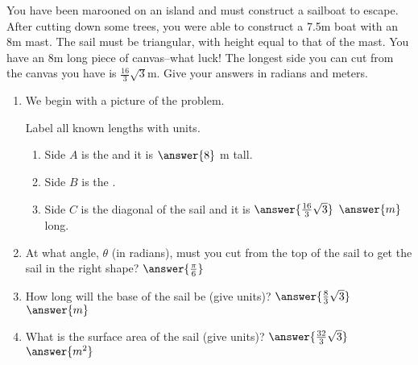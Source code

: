 \documentclass{ximera}
\author{Elizabeth Campolongo}
\begin{document}
\begin{exercise}

You have been marooned on an island and must construct a sailboat to escape. After cutting down some trees, you were able to construct a 7.5m boat with an 8m mast. The sail must be triangular, with height equal to that of the mast. You have an 8m long piece of canvas--what luck! The longest side you can cut from the canvas you have is $\frac{16}{3}\sqrt{3}$m. 
Give your answers in radians and meters. 

\begin{enumerate}
\item We begin with a picture of the problem. 

		\begin{image}[2in]
		\end{image}

Label all known lengths with units.
\begin{enumerate}
\item Side $A$ is the  and it is $\answer{8}$ m tall.

\item Side $B$ is the .

\item Side $C$ is the diagonal of the sail and it is $\answer{\frac{16}{3}\sqrt{3}}$ $\answer{m}$ long.
\end{enumerate}

\item At what angle, $\theta$ (in radians), must you cut from the top of the sail to get the sail in the right shape? $\answer{\frac{\pi}{6}}$

\item How long will the base of the sail be (give units)? $\answer{\frac{8}{3}\sqrt{3}}$ $\answer{m}$

\item What is the surface area of the sail (give units)? $\answer{\frac{32}{3}\sqrt{3}}$ $\answer{m^2}$

\end{enumerate}

\end{exercise}
\end{document}
